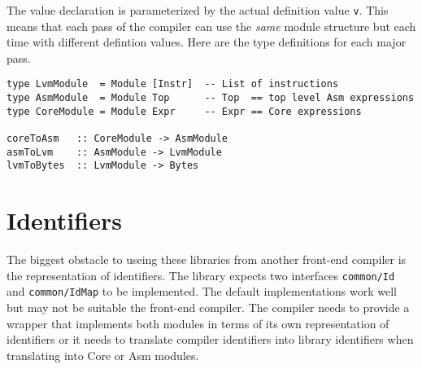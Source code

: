 \documentclass[a4]{article}
\newcommand{\code}[1]{\texttt{#1}}
\begin{document}
The value declaration is parameterized by the actual definition value \code{v}.
This means that each pass of the compiler can use the \emph{same} module
structure but each time with different defintion values. Here are the type
definitions for each major pass.
\begin{verbatim}
type LvmModule  = Module [Instr]  -- List of instructions
type AsmModule  = Module Top      -- Top  == top level Asm expressions
type CoreModule = Module Expr     -- Expr == Core expressions

coreToAsm   :: CoreModule -> AsmModule
asmToLvm    :: AsmModule -> LvmModule
lvmToBytes  :: LvmModule -> Bytes
\end{verbatim}

\section{Identifiers}

The biggest obstacle to useing these libraries from another front-end
compiler is the representation of identifiers. The library expects
two interfaces \code{common/Id} and \code{common/IdMap} to be implemented.
The default implementations work well but may not be suitable the
front-end compiler. The compiler needs to provide a wrapper that implements
both modules in terms of its own representation of identifiers or it
needs to translate compiler identifiers into library identifiers when
translating into Core or Asm modules.
\end{document}
